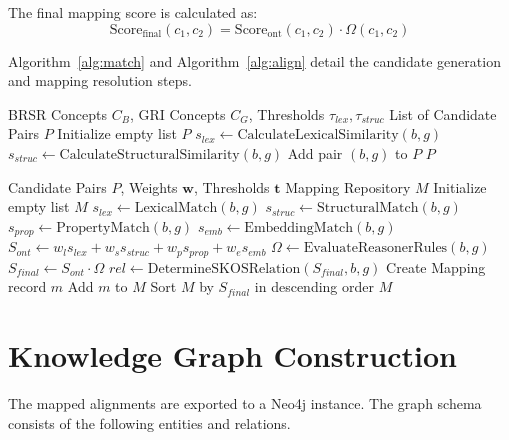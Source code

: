 \documentclass[journal,compsoc]{IEEEtran}
\begin{document}
\begin{itemize}
The final mapping score is calculated as:
\begin{equation}
\text{Score}_{\text{final}}(c_1, c_2) = \text{Score}_{\text{ont}}(c_1, c_2) \cdot \Omega(c_1, c_2)
\label{eq:final}
\end{equation}

Algorithm~\ref{alg:match} and Algorithm~\ref{alg:align} detail the candidate generation and mapping resolution steps.

\begin{algorithm}
\caption{Ontology-Guided Candidate Generation}
\label{alg:match}
\begin{algorithmic}[1]
\REQUIRE BRSR Concepts $C_B$, GRI Concepts $C_G$, Thresholds $\tau_{lex}, \tau_{struc}$
\ENSURE List of Candidate Pairs $P$
\STATE Initialize empty list $P$
        \STATE $s_{lex} \leftarrow \text{CalculateLexicalSimilarity}(b, g)$
        \STATE $s_{struc} \leftarrow \text{CalculateStructuralSimilarity}(b, g)$
            \STATE Add pair $(b, g)$ to $P$
        \ENDIF
    \ENDFOR
\ENDFOR
\RETURN $P$
\end{algorithmic}
\end{algorithm}

\begin{algorithm}
\caption{Ontology Mapping Engine}
\label{alg:align}
\begin{algorithmic}[1]
\REQUIRE Candidate Pairs $P$, Weights $\mathbf{w}$, Thresholds $\mathbf{t}$
\ENSURE Mapping Repository $M$
\STATE Initialize empty list $M$
    \STATE $s_{lex} \leftarrow \text{LexicalMatch}(b, g)$
    \STATE $s_{struc} \leftarrow \text{StructuralMatch}(b, g)$
    \STATE $s_{prop} \leftarrow \text{PropertyMatch}(b, g)$
    \STATE $s_{emb} \leftarrow \text{EmbeddingMatch}(b, g)$
    \STATE $S_{ont} \leftarrow w_l s_{lex} + w_s s_{struc} + w_p s_{prop} + w_e s_{emb}$
    \STATE $\Omega \leftarrow \text{EvaluateReasonerRules}(b, g)$
    \STATE $S_{final} \leftarrow S_{ont} \cdot \Omega$
        \STATE $rel \leftarrow \text{DetermineSKOSRelation}(S_{final}, b, g)$
        \STATE Create Mapping record $m$
        \STATE Add $m$ to $M$
    \ENDIF
\ENDFOR
\STATE Sort $M$ by $S_{final}$ in descending order
\RETURN $M$
\end{algorithmic}
\end{algorithm}

\section{Knowledge Graph Construction}
The mapped alignments are exported to a Neo4j instance. The graph schema consists of the following entities and relations.


\end{itemize}
\end{document}

